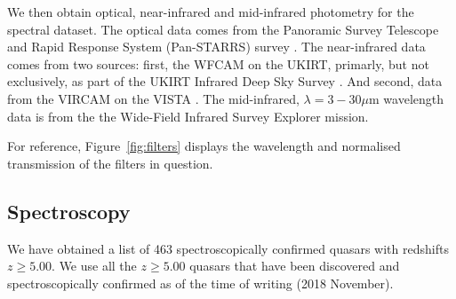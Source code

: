 \documentclass[usenatbib]{mnras}
\begin{document}
We then obtain optical, near-infrared and mid-infrared photometry for
the spectral dataset. The optical data comes from the Panoramic Survey
Telescope and Rapid Response System (Pan-STARRS) survey
\citep{Chambers2016}. The near-infrared data comes from two sources:
first, the WFCAM \citep[][]{Casali2007} on the UKIRT, primarly, but
not exclusively, as part of the UKIRT Infrared Deep Sky Survey
\citep[UKIDSS; ][]{Lawrence2007}.  And second, data from the VIRCAM on
the VISTA \citep[][]{Emerson2006, Dalton2006}. The mid-infrared,
$\lambda=3-30\mu$m wavelength data is from the the Wide-Field Infrared
Survey Explorer \citep[WISE;][]{Wright2010, Cutri2013} mission.

For reference, Figure~\ref{fig:filters} displays the wavelength and normalised transmission 
of the filters in question. 






\subsection{Spectroscopy} 
We have obtained a list of 463 spectroscopically confirmed quasars
with redshifts $z\geq5.00$. We use all the $z\geq5.00$ quasars that
have been discovered and spectroscopically confirmed as of the time of
writing (2018 November).
\end{document}
